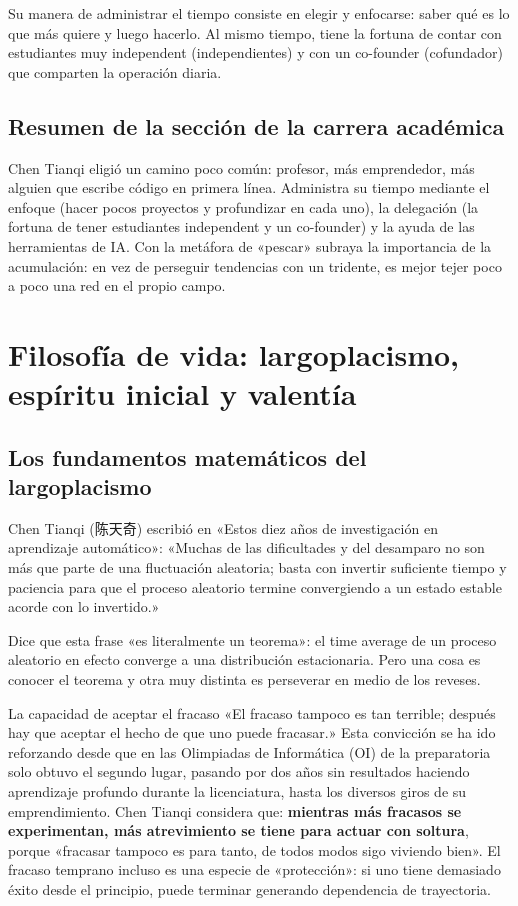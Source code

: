 \documentclass[a4paper]{article}
\begin{document}
Su manera de administrar el tiempo consiste en elegir y enfocarse: saber qué es lo que más quiere y luego hacerlo. Al mismo tiempo, tiene la fortuna de contar con estudiantes muy independent (independientes) y con un co-founder (cofundador) que comparten la operación diaria.

\subsection{Resumen de la sección de la carrera académica}

Chen Tianqi eligió un camino poco común: profesor, más emprendedor, más alguien que escribe código en primera línea. Administra su tiempo mediante el enfoque (hacer pocos proyectos y profundizar en cada uno), la delegación (la fortuna de tener estudiantes independent y un co-founder) y la ayuda de las herramientas de IA. Con la metáfora de «pescar» subraya la importancia de la acumulación: en vez de perseguir tendencias con un tridente, es mejor tejer poco a poco una red en el propio campo.
\section{Filosofía de vida: largoplacismo, espíritu inicial y valentía}

\subsection{Los fundamentos matemáticos del largoplacismo}

Chen Tianqi (陈天奇) escribió en «Estos diez años de investigación en aprendizaje automático»: «Muchas de las dificultades y del desamparo no son más que parte de una fluctuación aleatoria; basta con invertir suficiente tiempo y paciencia para que el proceso aleatorio termine convergiendo a un estado estable acorde con lo invertido.»

Dice que esta frase «es literalmente un teorema»: el time average de un proceso aleatorio en efecto converge a una distribución estacionaria. Pero una cosa es conocer el teorema y otra muy distinta es perseverar en medio de los reveses.

\begin{importantbox}{La capacidad de aceptar el fracaso}
«El fracaso tampoco es tan terrible; después hay que aceptar el hecho de que uno puede fracasar.» Esta convicción se ha ido reforzando desde que en las Olimpiadas de Informática (OI) de la preparatoria solo obtuvo el segundo lugar, pasando por dos años sin resultados haciendo aprendizaje profundo durante la licenciatura, hasta los diversos giros de su emprendimiento. Chen Tianqi considera que: \textbf{mientras más fracasos se experimentan, más atrevimiento se tiene para actuar con soltura}, porque «fracasar tampoco es para tanto, de todos modos sigo viviendo bien». El fracaso temprano incluso es una especie de «protección»: si uno tiene demasiado éxito desde el principio, puede terminar generando dependencia de trayectoria.
\end{importantbox}
\end{document}
